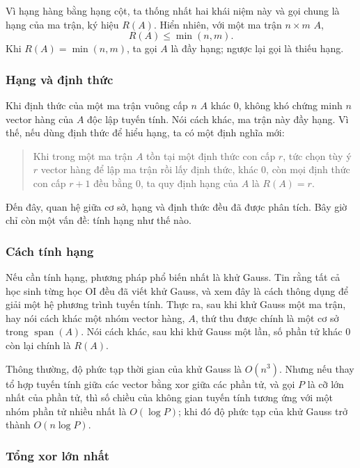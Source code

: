 \documentclass[11pt]{article}
\begin{document}
Vì hạng hàng bằng hạng cột, ta thống nhất hai khái niệm này và gọi chung là hạng
của ma trận, ký hiệu \(R(A)\). Hiển nhiên, với một ma trận \(n\times m\) \(A\),
\[
  R(A)\le\min(n,m).
\]
Khi \(R(A)=\min(n,m)\), ta gọi \(A\) là đầy hạng; ngược lại gọi là thiếu hạng.

\subsubsection{Hạng và định thức}

Khi định thức của một ma trận vuông cấp \(n\) \(A\) khác \(0\), không khó chứng
minh \(n\) vector hàng của \(A\) độc lập tuyến tính. Nói cách khác, ma trận này
đầy hạng. Vì thế, nếu dùng định thức để hiểu hạng, ta có một định nghĩa mới:

\begin{quote}
Khi trong một ma trận \(A\) tồn tại một định thức con cấp \(r\), tức chọn tùy ý
\(r\) vector hàng để lập ma trận rồi lấy định thức, khác \(0\), còn mọi định
thức con cấp \(r+1\) đều bằng \(0\), ta quy định hạng của \(A\) là \(R(A)=r\).
\end{quote}

Đến đây, quan hệ giữa cơ sở, hạng và định thức đều đã được phân tích. Bây giờ
chỉ còn một vấn đề: tính hạng như thế nào.

\subsubsection{Cách tính hạng}

Nếu cần tính hạng, phương pháp phổ biến nhất là khử Gauss. Tin rằng tất cả học
sinh từng học OI đều đã viết khử Gauss, và xem đây là cách thông dụng để giải
một hệ phương trình tuyến tính. Thực ra, sau khi khử Gauss một ma trận, hay nói
cách khác một nhóm vector hàng, \(A\), thứ thu được chính là một cơ sở trong
\(\operatorname{span}(A)\). Nói cách khác, sau khi khử Gauss một lần, số phần tử
khác \(0\) còn lại chính là \(R(A)\).

Thông thường, độ phức tạp thời gian của khử Gauss là \(O(n^3)\). Nhưng nếu thay
tổ hợp tuyến tính giữa các vector bằng xor giữa các phần tử, và gọi \(P\) là cỡ
lớn nhất của phần tử, thì số chiều của không gian tuyến tính tương ứng với một
nhóm phần tử nhiều nhất là \(O(\log P)\); khi đó độ phức tạp của khử Gauss trở
thành \(O(n\log P)\).

\subsubsection{Tổng xor lớn nhất}
\end{document}
